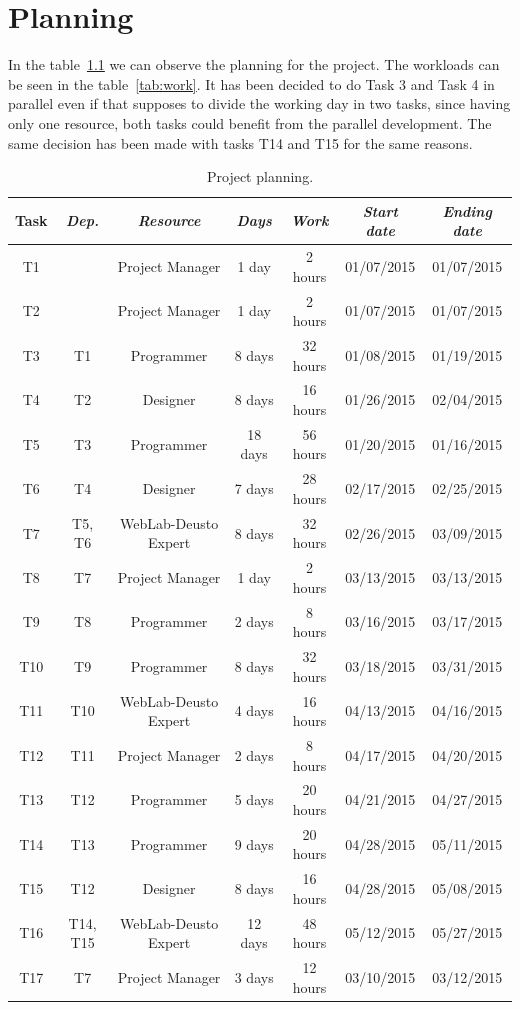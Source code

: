 \chapter{Planning}

In the table~\ref{tab:plan} we can observe the planning for the project. The workloads can be seen
in the table~\ref{tab:work}. It has been decided to do Task 3 and Task 4 in parallel even if that
supposes to divide the working day in two tasks, since having only one resource, both tasks could
benefit from the parallel development. The same decision has been made with tasks T14 and T15 for
the same reasons.

\begin{table}[h]
	\centering
	\caption{Project planning.}\label{tab:plan}
	\begin{tabular}{ccccccc}
		\toprule
		\textbf{Task} & \emph{Dep.} & \emph{Resource} & \emph{Days} & \emph{Work} & \emph{Start date} & \emph{Ending date}\\
		\midrule
		T1	&				& Project Manager		& 1 day		&	2 hours		& 01/07/2015	& 01/07/2015	\\
		T2	&				& Project Manager		& 1 day		&	2 hours		& 01/07/2015	& 01/07/2015	\\
		T3	&	T1			& Programmer			& 8 days	&	32 hours	& 01/08/2015	& 01/19/2015	\\
		T4	&	T2			& Designer				& 8 days	&	16 hours	& 01/26/2015	& 02/04/2015	\\
		T5	&	T3			& Programmer			& 18 days	&	56 hours	& 01/20/2015	& 01/16/2015	\\
		T6	&	T4			& Designer				& 7 days	&	28 hours	& 02/17/2015	& 02/25/2015	\\
		T7	&	T5, T6		& WebLab-Deusto	Expert	& 8 days	&	32 hours	& 02/26/2015	& 03/09/2015	\\
		T8	&	T7			& Project Manager		& 1 day		&	2 hours		& 03/13/2015	& 03/13/2015	\\
		T9	&	T8			& Programmer			& 2 days	&	8 hours		& 03/16/2015	& 03/17/2015	\\
		T10	&	T9			& Programmer			& 8 days	&	32 hours	& 03/18/2015	& 03/31/2015	\\
		T11	&	T10			& WebLab-Deusto	Expert	& 4 days	&	16 hours	& 04/13/2015	& 04/16/2015	\\
		T12	&	T11			& Project Manager		& 2 days	&	8 hours		& 04/17/2015	& 04/20/2015	\\
		T13	&	T12			& Programmer			& 5 days	&	20 hours	& 04/21/2015	& 04/27/2015	\\
		T14	&	T13			& Programmer			& 9 days	&	20 hours	& 04/28/2015	& 05/11/2015	\\
		T15	&	T12			& Designer				& 8 days	&	16 hours	& 04/28/2015	& 05/08/2015	\\
		T16	&	T14, T15	& WebLab-Deusto	Expert	& 12 days	&	48 hours	& 05/12/2015	& 05/27/2015	\\
		T17	&	T7			& Project Manager		& 3 days	&	12 hours	& 03/10/2015	& 03/12/2015	\\
		\bottomrule
	\end{tabular}
\end{table}

